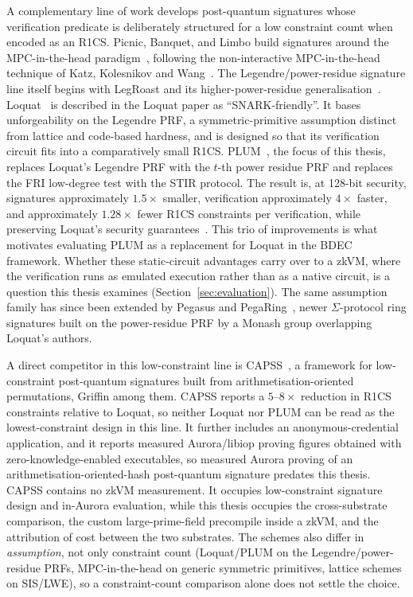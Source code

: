 A complementary line of work develops post-quantum signatures whose verification predicate is deliberately structured for a low constraint count when encoded as an R1CS. Picnic, Banquet, and Limbo build signatures around the MPC-in-the-head paradigm~\cite{chase2017picnic,baum2021banquet,desaintguilhem2021limbo}, following the non-interactive MPC-in-the-head technique of Katz, Kolesnikov and Wang~\cite{katz2018kkw}. The Legendre/power-residue signature line itself begins with LegRoast and its higher-power-residue generalisation~\cite{beullens2020legroast}. Loquat~\cite{cryptoeprint:2024/868} is described in the Loquat paper as ``SNARK-friendly''. It bases unforgeability on the Legendre PRF, a symmetric-primitive assumption distinct from lattice and code-based hardness, and is designed so that its verification circuit fits into a comparatively small R1CS. PLUM~\cite{10.1007/978-981-95-2961-2_6}, the focus of this thesis, replaces Loquat's Legendre PRF with the $t$-th power residue PRF and replaces the FRI low-degree test with the STIR protocol. The result is, at 128-bit security, signatures approximately $1.5\times$ smaller, verification approximately $4\times$ faster, and approximately $1.28\times$ fewer R1CS constraints per verification, while preserving Loquat's security guarantees~\cite{10.1007/978-981-95-2961-2_6}. This trio of improvements is what motivates evaluating PLUM as a replacement for Loquat in the BDEC framework. Whether these static-circuit advantages carry over to a zkVM, where the verification runs as emulated execution rather than as a native circuit, is a question this thesis examines (Section~\ref{sec:evaluation}). The same assumption family has since been extended by Pegasus and PegaRing~\cite{cryptoeprint:2025/1841}, newer $\Sigma$-protocol ring signatures built on the power-residue PRF by a Monash group overlapping Loquat's authors.

A direct competitor in this low-constraint line is CAPSS~\cite{feneuil2025capss}, a framework for low-constraint post-quantum signatures built from arithmetisation-oriented permutations, Griffin among them. CAPSS reports a $5$--$8\times$ reduction in R1CS constraints relative to Loquat, so neither Loquat nor PLUM can be read as the lowest-constraint design in this line. It further includes an anonymous-credential application, and it reports measured Aurora/libiop proving figures obtained with zero-knowledge-enabled executables, so measured Aurora proving of an arithmetisation-oriented-hash post-quantum signature predates this thesis. CAPSS contains no zkVM measurement. It occupies low-constraint signature design and in-Aurora evaluation, while this thesis occupies the cross-substrate comparison, the custom large-prime-field precompile inside a zkVM, and the attribution of cost between the two substrates. The schemes also differ in \emph{assumption}, not only constraint count (Loquat/PLUM on the Legendre/power-residue PRFs, MPC-in-the-head on generic symmetric primitives, lattice schemes on SIS/LWE), so a constraint-count comparison alone does not settle the choice.

